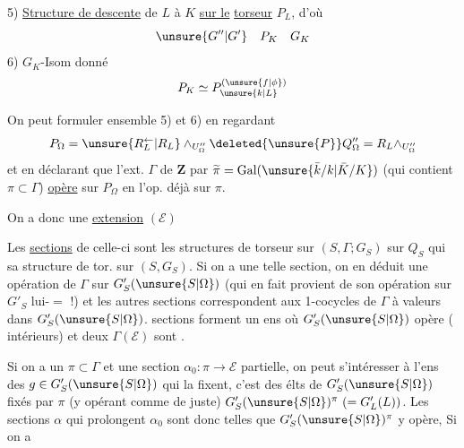 5) \uline{Structure de descente} de $L$ à $K$ \uline{sur le}
\uline{torseur} $P_L$, d'où
\[
\unsure{G''|G'}\quad P_K\quad G_K
\]
6) $G_K$-Isom donné
\[
P_K\simeq P_{\unsure{k|L}}^{(\unsure{f|\phi})}
\]

On peut formuler ensemble 5) et 6) en regardant
\[
P_\Omega=\unsure{R_L^{\leftarrow}|R_L}\wedge_{U''_\Omega}\deleted{\unsure{P}}Q''_\Omega
=R_L\wedge_{U''_\Omega}
\]
et en déclarant que l'ext. $\Gamma$ de $\mathbf Z$ par
$\widetilde\pi=\operatorname{Gal}(\unsure{\bar k/k|\bar K/K})$
(qui contient $\pi\subset\Gamma$) \uline{opère} sur $P_\Omega$ en 
l'op.  déjà sur $\pi$.

On a donc une \uline{extension}
\hfill $(\mathcal E)$

\inserted{$\pi$}

Les \uline{sections} de celle-ci sont les structures de torseur sur $(S,\Gamma;G_S)$ sur $Q_S$ qui
 sa structure de tor. sur $(S,G_S)$.
Si on a une telle section, on en déduit une opération de $\Gamma$ sur $G'_S(\unsure{S|\Omega})$
(qui en fait provient de son opération sur $G'_S$ lui-$=$ !)
et les autres sections correspondent aux 1-cocycles de $\Gamma$ à valeurs dans $G'_S(\unsure{S|\Omega})$.
 sections
forment  un ens où $G'_S(\unsure{S|\Omega})$ opère
( intérieurs) et deux 
$\Gamma(\mathcal E)$ sont
.

Si on a un  $\pi\subset\Gamma$ et une section
$\alpha_0:\pi\longrightarrow\mathcal E$ partielle, on peut s'intéresser
à l'ens des $g\in G'_S(\unsure{S|\Omega})$ qui la fixent, c'est  des
élts de $G'_S(\unsure{S|\Omega})$ fixés par $\pi$ (y opérant comme de juste)
$G'_S(\unsure{S|\Omega})^\pi\ (=G'_L(L))$.
Les sections $\alpha$ qui prolongent $\alpha_0$ sont donc telles que
$G'_S(\unsure{S|\Omega})^\pi$ y opère, Si on a

